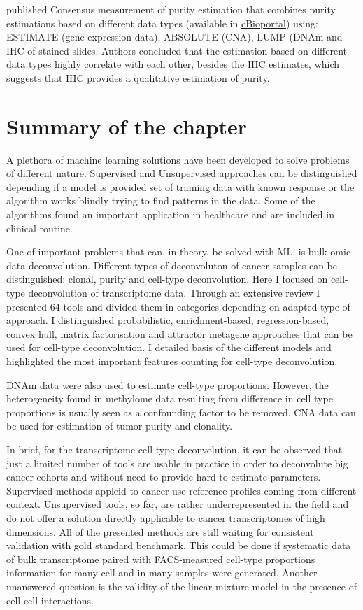 \documentclass[12pt,]{book}
\theoremstyle{definition}
\theoremstyle{definition}
\theoremstyle{definition}
\theoremstyle{remark}
\begin{document}
\citet{Aran2015} published Consensus measurement of purity estimation
that combines purity estimations based on different data types
(available in \href{http://www.cbioportal.org/}{cBioportal}) using:
ESTIMATE \citep{Yoshihara2013} (gene expression data), ABSOLUTE
\citep{Carter2012} (CNA), LUMP \citep{Aran2015} (DNAm and IHC of stained
slides. Authors concluded that the estimation based on different data
types highly correlate with each other, besides the IHC estimates, which
suggests that IHC provides a qualitative estimation of purity.

\hypertarget{summary-of-the-chapter-1}{%
\section{Summary of the chapter}\label{summary-of-the-chapter-1}}

A plethora of machine learning solutions have been developed to solve
problems of different nature. Supervised and Unsupervised approaches can
be distinguished depending if a model is provided set of training data
with known response or the algorithm works blindly trying to find
patterns in the data. Some of the algorithms found an important
application in healthcare and are included in clinical routine.

One of important problems that can, in theory, be solved with ML, is
bulk omic data deconvolution. Different types of deconvoluton of cancer
samples can be distinguished: clonal, purity and cell-type
deconvolution. Here I focused on cell-type deconvolution of
transcriptome data. Through an extensive review I presented 64 tools and
divided them in categories depending on adapted type of approach. I
distinguished probabilistic, enrichment-based, regression-based, convex
hull, matrix factorisation and attractor metagene approaches that can be
used for cell-type deconvolution. I detailed basis of the different
models and highlighted the most important features counting for
cell-type deconvolution.

DNAm data were also used to estimate cell-type proportions. However, the
heterogeneity found in methylome data resulting from difference in cell
type proportions is usually seen as a confounding factor to be removed.
CNA data can be used for estimation of tumor purity and clonality.

In brief, for the transcriptome cell-type deconvolution, it can be
observed that just a limited number of tools are usable in practice in
order to deconvolute big cancer cohorts and without need to provide hard
to estimate parameters. Supervised methods appleid to cancer use
reference-profiles coming from different context. Unsupervised tools, so
far, are rather underrepresented in the field and do not offer a
solution directly applicable to cancer transcriptomes of high
dimensions. All of the presented methods are still waiting for
consistent validation with gold standard benchmark. This could be done
if systematic data of bulk transcriptome paired with FACS-measured
cell-type proportions information for many cell and in many samples were
generated. Another unanswered question is the validity of the linear
mixture model in the presence of cell-cell interactions.
\end{document}
